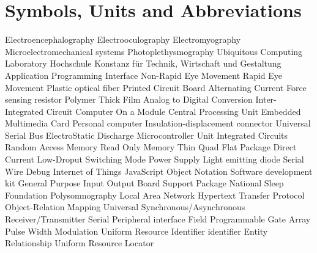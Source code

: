 \chapter*{Symbols, Units and Abbreviations}

\begin{acronym}
   {Electroencephalography}
   {Electrooculography}
   {Electromyography}
   {Microelectromechanical systems}
   {Photoplethysmography}
   {Ubiquitous Computing Laboratory}
   {Hochschule Konstanz f\"ur Technik, Wirtschaft und Gestaltung}
   {Application Programming Interface}
   {Non-Rapid Eye Movement}
   {Rapid Eye Movement}
   {Plastic optical fiber}
   {Printed Circuit Board}
   {Alternating Current}
   {Force sensing resistor}
   {Polymer Thick Film}
   {Analog to Digital Conversion}
   {Inter-Integrated Circuit}
   {Computer On a Module}
   {Central Processing Unit}
   {Embedded Multimedia Card}
   {Personal computer}
   {Insulation-displacement connector}
   {Universal Serial Bus}
   {ElectroStatic Discharge}
   {Microcontroller Unit}
   {Integrated Circuits}
   {Random Access Memory}
   {Read Only Memory}
   {Thin Quad Flat Package}
   {Direct Current}
   {Low-Droput}
   {Switching Mode Power Supply}
   {Light emitting diode}
   {Serial Wire Debug}
   {Internet of Things}
   {JavaScript Object Notation}
   {Software development kit}
   {General Purpose Input Output}
   {Board Support Package}
   {National Sleep Foundation}
   {Polysomnography}
   {Local Area Network}
   {Hypertext Transfer Protocol}
   {Object-Relation Mapping}
   {Universal Synchronous/Asynchronous Receiver/Transmitter}
   {Serial Peripheral interface}
   {Field Programmable Gate Array}
   {Pulse Width Modulation}
   {Uniform Resource Identifier}
   {identifier}
   {Entity Relationship}
   {Uniform Resource Locator}
\end{acronym}

\newpage